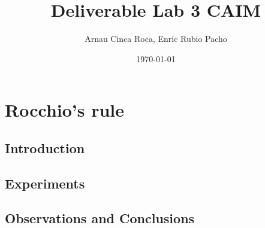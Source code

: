 \documentclass[11pt]{article}
\title{Deliverable Lab 3 CAIM}
\author{Arnau Cinca Roca, Enric Rubio Pacho}
\date\today
\begin{document}
\maketitle

\section{Rocchio's rule}
\subsection{Introduction}

\subsection{Experiments}


\subsection{Observations and Conclusions}
\end{document}
